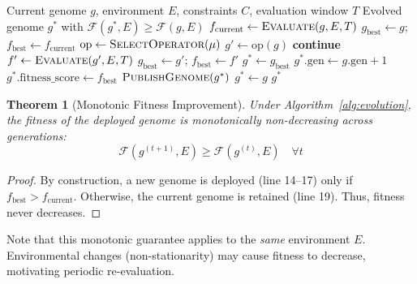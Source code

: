 \documentclass{article}
\newcommand{\REQUIRE}{\Require}
\newcommand{\ENSURE}{\Ensure}
\newtheorem{theorem}{Theorem}
\newcommand{\fitnessfn}{\mathcal{F}}
\begin{document}
\begin{algorithm}[t]
\caption{Genome Evolution with Fitness-Guided Mutation}
\label{alg:evolution}
\begin{algorithmic}[1]
\REQUIRE Current genome $g$, environment $E$, constraints $C$, evaluation window $T$
\ENSURE Evolved genome $g^*$ with $\fitnessfn(g^*, E) \geq \fitnessfn(g, E)$
\State $f_{\text{current}} \leftarrow \textsc{Evaluate}(g, E, T)$ 
\State $g_{\text{best}} \leftarrow g$; $f_{\text{best}} \leftarrow f_{\text{current}}$
    \State $\text{op} \leftarrow \textsc{SelectOperator}(\mu)$ 
    \State $g' \leftarrow \text{op}(g)$ 
        \State \textbf{continue} 
    \EndIf
    \State $f' \leftarrow \textsc{Evaluate}(g', E, T)$ 
        \State $g_{\text{best}} \leftarrow g'$; $f_{\text{best}} \leftarrow f'$
    \EndIf
\EndFor
{}
    \State $g^* \leftarrow g_{\text{best}}$
    \State $g^*.\text{gen} \leftarrow g.\text{gen} + 1$
    \State $g^*.\text{fitness\_score} \leftarrow f_{\text{best}}$
    \State $\textsc{PublishGenome}(g^*)$ 
\Else
    \State $g^* \leftarrow g$ 
\EndIf
\State \Return $g^*$
\end{algorithmic}
\end{algorithm}

\begin{theorem}[Monotonic Fitness Improvement]
Under Algorithm~\ref{alg:evolution}, the fitness of the deployed genome is monotonically non-decreasing across generations:
\begin{equation}
    \fitnessfn(g^{(t+1)}, E) \geq \fitnessfn(g^{(t)}, E) \quad \forall t
\end{equation}
\end{theorem}
\begin{proof}
By construction, a new genome is deployed (line 14--17) only if $f_{\text{best}} > f_{\text{current}}$. Otherwise, the current genome is retained (line 19). Thus, fitness never decreases.
\end{proof}

Note that this monotonic guarantee applies to the \textit{same} environment $E$. Environmental changes (non-stationarity) may cause fitness to decrease, motivating periodic re-evaluation.
\end{document}
